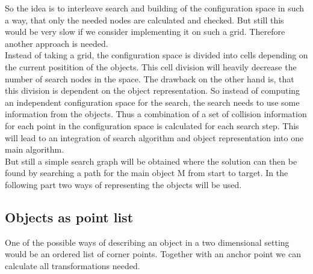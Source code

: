 So the idea is to interleave search and building of the configuration space in such a way, that only the needed nodes are calculated and checked.
But still this would be very slow if we consider implementing it on such a grid. Therefore another approach is needed.\\
Instead of taking a grid, the configuration space is divided into cells depending on the current positition of the objects. This cell division will heavily decrease the number of search nodes in the space. The drawback on the other hand is, that this division is dependent on the object representation. So instead of computing an independent configuration space for the search, the search needs to use some information from the objects. Thus a combination of a set of collision information for each point in the configuration space is calculated for each search step. This will lead to an integration of search algorithm and object representation into one main algorithm.\\
But still a simple search graph will be obtained where the solution can then be found by searching a path for the main object M from start to target. In the following part two ways of representing the objects will be used.


\subsection{Objects as point list}
\label{subsec::pointlist}
One of the possible ways of describing an object in a two dimensional setting would be an ordered list of corner points.  Together with an anchor point we can calculate all transformations needed.
